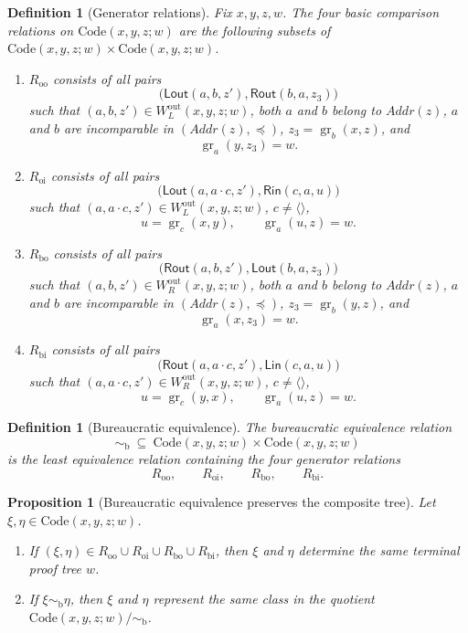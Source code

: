 \documentclass[11pt]{article}
\newtheorem{proposition}[theorem]{Proposition}
\newtheorem{definition}[theorem]{Definition}
\newcommand{\Addr}{\mathit{Addr}}
\newcommand{\graftat}[3]{\operatorname{gr}_{#2}(#3,#1)}
\begin{document}
\begin{definition}[Generator relations]
Fix \(x,y,z,w\). The four basic comparison relations on
\(\mathrm{Code}(x,y,z;w)\) are the following subsets of
\(\mathrm{Code}(x,y,z;w)\times \mathrm{Code}(x,y,z;w)\).
\begin{enumerate}[label=\textup{(\roman*)}]
\item \(R_{\mathrm{oo}}\) consists of all pairs
\[
\bigl(\mathsf{Lout}(a,b,z'),\mathsf{Rout}(b,a,z_3)\bigr)
\]
such that \((a,b,z')\in W^{\mathrm{out}}_L(x,y,z;w)\), both \(a\) and \(b\)
belong to \(\Addr(z)\), \(a\) and \(b\) are incomparable in
\((\Addr(z),\preceq)\), \(z_3=\graftat{z}{b}{x}\), and
\[
\graftat{z_3}{a}{y}=w.
\]
\item \(R_{\mathrm{oi}}\) consists of all pairs
\[
\bigl(\mathsf{Lout}(a,a\cdot c,z'),\mathsf{Rin}(c,a,u)\bigr)
\]
such that \((a,a\cdot c,z')\in W^{\mathrm{out}}_L(x,y,z;w)\),
\(c\neq \langle\rangle\),
\[
u=\graftat{y}{c}{x},
\qquad
\graftat{z}{a}{u}=w.
\]
\item \(R_{\mathrm{bo}}\) consists of all pairs
\[
\bigl(\mathsf{Rout}(a,b,z'),\mathsf{Lout}(b,a,z_3)\bigr)
\]
such that \((a,b,z')\in W^{\mathrm{out}}_R(x,y,z;w)\), both \(a\) and \(b\)
belong to \(\Addr(z)\), \(a\) and \(b\) are incomparable in
\((\Addr(z),\preceq)\), \(z_3=\graftat{z}{b}{y}\), and
\[
\graftat{z_3}{a}{x}=w.
\]
\item \(R_{\mathrm{bi}}\) consists of all pairs
\[
\bigl(\mathsf{Rout}(a,a\cdot c,z'),\mathsf{Lin}(c,a,u)\bigr)
\]
such that \((a,a\cdot c,z')\in W^{\mathrm{out}}_R(x,y,z;w)\),
\(c\neq \langle\rangle\),
\[
u=\graftat{x}{c}{y},
\qquad
\graftat{z}{a}{u}=w.
\]
\end{enumerate}
\end{definition}

\begin{definition}[Bureaucratic equivalence]
The \emph{bureaucratic equivalence relation}
\[
\sim_{\mathrm b}\ \subseteq\ \mathrm{Code}(x,y,z;w)\times \mathrm{Code}(x,y,z;w)
\]
is the least equivalence relation containing the four generator relations
\[
R_{\mathrm{oo}},\qquad
R_{\mathrm{oi}},\qquad
R_{\mathrm{bo}},\qquad
R_{\mathrm{bi}}.
\]
\end{definition}

\begin{proposition}[Bureaucratic equivalence preserves the composite tree]
Let \(\xi,\eta\in \mathrm{Code}(x,y,z;w)\).
\begin{enumerate}[label=\textup{(\roman*)}]
\item If \((\xi,\eta)\in R_{\mathrm{oo}}\cup R_{\mathrm{oi}}\cup
R_{\mathrm{bo}}\cup R_{\mathrm{bi}}\), then \(\xi\) and \(\eta\) determine the
same terminal proof tree \(w\).
\item If \(\xi\sim_{\mathrm b}\eta\), then \(\xi\) and \(\eta\) represent the
same class in the quotient \(\mathrm{Code}(x,y,z;w)/{\sim_{\mathrm b}}\).
\end{enumerate}
\end{proposition}
\end{document}

